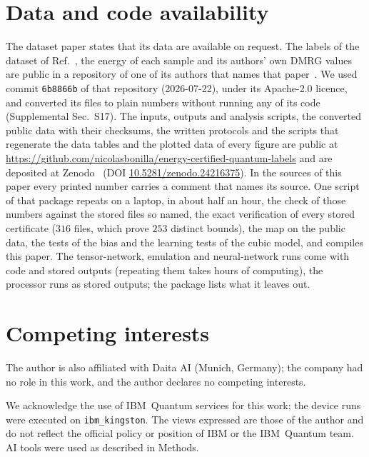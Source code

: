 \documentclass[aps,prx,twocolumn,10pt,superscriptaddress,nofootinbib,longbibliography,floatfix]{revtex4-2}
\theoremstyle{remark}
\begin{document}
\section*{Data and code availability}
The dataset paper states that its data are available on request. The labels of the dataset of
Ref.~\cite{jaderberg2026}, the energy of each sample and its authors' own DMRG values are public in a repository of
one of its authors that names that paper~\cite{jaderberg2026data}. We used commit \texttt{6b8866b} of that repository
(2026-07-22), under its Apache-2.0 licence, and converted its files to plain numbers without running any of its %
code (Supplemental Sec.~S17).
The inputs, outputs and analysis scripts, the converted public data with their checksums, the written protocols and
the scripts that regenerate the data tables and the plotted data of every figure are public at
\url{https://github.com/nicolasbonilla/energy-certified-quantum-labels} and are deposited at
Zenodo~\cite{bonillavargas2026deposit} (DOI \href{https://doi.org/10.5281/zenodo.24216375}{10.5281/zenodo.24216375}). %
In the sources of this paper every printed number carries a comment that names its source. One script of that
package repeats on a laptop, in about half an hour, the check of those numbers against the stored files so named,
the exact verification of every stored certificate ($316$ files, which prove $253$ distinct bounds), the map on the %
public data, the tests of the bias and the learning tests of the cubic model, and compiles this paper. The
tensor-network, emulation and neural-network runs come with code and stored outputs (repeating them takes hours of
computing), the processor runs as stored outputs; the package lists what it leaves out.


\section*{Competing interests}
The author is also affiliated with Daita AI (Munich, Germany); the company had no role in this work, and the author
declares no competing interests.

\begin{acknowledgments}
We acknowledge the use of IBM~Quantum services for this work; the device runs were executed on
\texttt{ibm\_kingston}. The views expressed are those of the author and do not reflect the official policy or position
of IBM or the IBM~Quantum team. AI tools were used as described in Methods.

\end{acknowledgments}

\nocite{hastings2006,temple1928,baccari2020,candelori2026,stoudenmire2012,damour2023,deroeck2015,trivedi2022,teufel2026,osborne2007,sandvik2026,jiang2011,sandvik1997,viteritti2023,vicentini2022,nsy2019,bravyi2010,michalakis2013,frohlich2020,delvecchio2022,deroeck2019}


\end{document}
